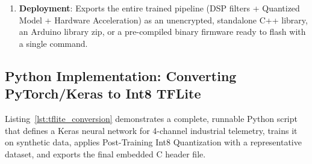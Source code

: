 \begin{enumerate}
\begin{itemize}
        \item \textbf{EON Compiler}: Edge Impulse's proprietary compiler innovation. Instead of running a generic TFLM interpreter with virtual function tables and FlatBuffer parsing, the EON Compiler compiles the model directly into **static C++ source code functions**, eliminating interpreter overhead and reducing SRAM consumption by $25\%$ to $55\%$!
    \end{itemize}
    \item \textbf{Deployment}: Exports the entire trained pipeline (DSP filters + Quantized Model + Hardware Acceleration) as an unencrypted, standalone C++ library, an Arduino library zip, or a pre-compiled binary firmware ready to flash with a single command.
\end{enumerate}

\subsection{Python Implementation: Converting PyTorch/Keras to Int8 TFLite}\label{subsec:python_conversion}

Listing~\ref{lst:tflite_conversion} demonstrates a complete, runnable Python script that defines a Keras neural network for 4-channel industrial telemetry, trains it on synthetic data, applies Post-Training Int8 Quantization with a representative dataset, and exports the final embedded C header file.

